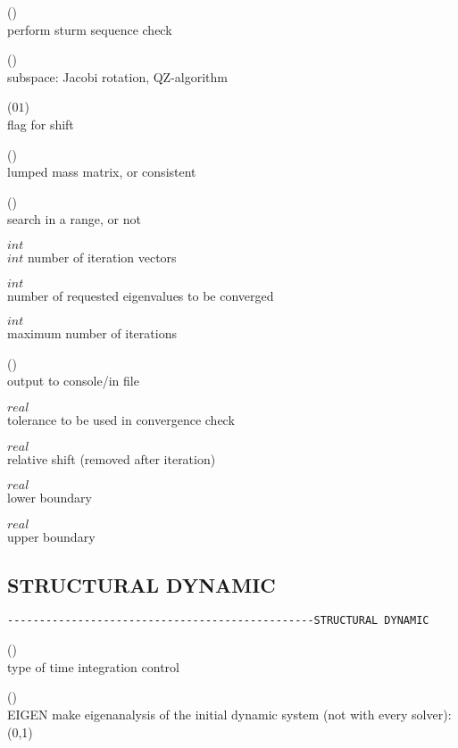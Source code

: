  (\kor{})\\
perform sturm sequence check

 (\kor{})\\
subspace: Jacobi rotation,  QZ-algorithm

 ($0$\kor$1$)\\
flag for shift

 (\kor{})\\
lumped mass matrix,  or consistent

 (\kor{})\\     
search in a range, or not

 $int$\\
$int$ number of iteration vectors

 $int$\\
number of requested eigenvalues to be converged

 $int$\\
maximum number of iterations

 (\kor{}\kor{})\\
output to console/in file

 $real$\\
tolerance to be used in convergence check

 $real$\\
relative shift (removed after iteration)

 $real$\\
lower boundary 

 $real$\\
upper boundary  


\subsection{STRUCTURAL DYNAMIC}
\begin{verbatim}
------------------------------------------------STRUCTURAL DYNAMIC
\end{verbatim}


 (\kor{}\kor{})\\
type of time integration control

 (\kor{})\\
EIGEN make eigenanalysis of the initial dynamic system (not with every solver): (0,1)

